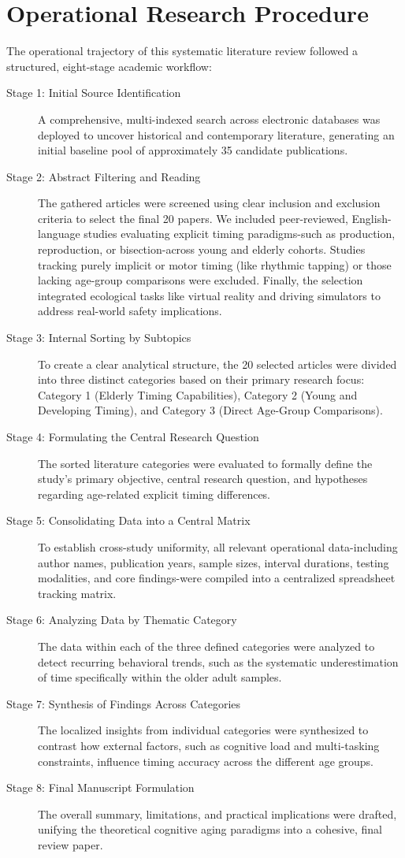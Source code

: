 \documentclass{custom_report}
\begin{document}
\section{Operational Research Procedure}
The operational trajectory of this systematic literature review followed a structured, eight-stage academic workflow:

\begin{description}
    \item[Stage 1: Initial Source Identification] A comprehensive, multi-indexed search across electronic databases was deployed to uncover historical and contemporary literature, generating an initial baseline pool of approximately 35 candidate publications.
    \item[Stage 2: Abstract Filtering and Reading] The gathered articles were screened using clear inclusion and exclusion criteria to select the final 20 papers. We included peer-reviewed, English-language studies evaluating explicit timing paradigms-such as production, reproduction, or bisection-across young and elderly cohorts. Studies tracking purely implicit or motor timing (like rhythmic tapping) or those lacking age-group comparisons were excluded. Finally, the selection integrated ecological tasks like virtual reality and driving simulators to address real-world safety implications.
    \item[Stage 3: Internal Sorting by Subtopics] To create a clear analytical structure, the 20 selected articles were divided into three distinct categories based on their primary research focus: Category 1 (Elderly Timing Capabilities), Category 2 (Young and Developing Timing), and Category 3 (Direct Age-Group Comparisons).
    \item[Stage 4: Formulating the Central Research Question] The sorted literature categories were evaluated to formally define the study's primary objective, central research question, and hypotheses regarding age-related explicit timing differences.
    \item[Stage 5: Consolidating Data into a Central Matrix] To establish cross-study uniformity, all relevant operational data-including author names, publication years, sample sizes, interval durations, testing modalities, and core findings-were compiled into a centralized spreadsheet tracking matrix.
    \item[Stage 6: Analyzing Data by Thematic Category] The data within each of the three defined categories were analyzed to detect recurring behavioral trends, such as the systematic underestimation of time specifically within the older adult samples.
    \item[Stage 7: Synthesis of Findings Across Categories] The localized insights from individual categories were synthesized to contrast how external factors, such as cognitive load and multi-tasking constraints, influence timing accuracy across the different age groups.
    \item[Stage 8: Final Manuscript Formulation] The overall summary, limitations, and practical implications were drafted, unifying the theoretical cognitive aging paradigms into a cohesive, final review paper.
\end{description}
\end{document}
